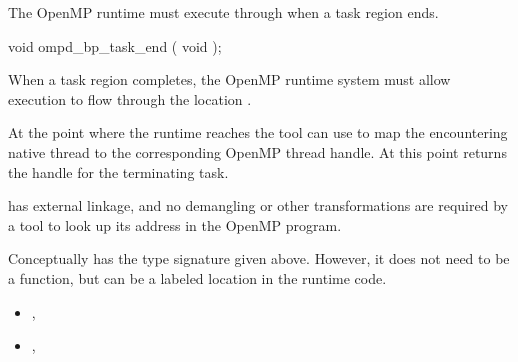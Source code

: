 \summary
The OpenMP runtime must execute through 
when a task region ends.


\begin{cspecific}
\begin{ompSyntax}
void ompd_bp_task_end ( void );
\end{ompSyntax}
\end{cspecific}


\descr

When a task region completes, the OpenMP runtime system
must allow execution to flow through the location .

At the point where the runtime reaches 
the tool can use
to map the encountering native thread to the corresponding
OpenMP thread handle.
At this point 
returns the handle for the terminating task.

\restrictions

 has external  linkage, and no
demangling or other transformations are required by a tool
to look up its address in the OpenMP program.

Conceptually  has the type signature
given above.
However, it does not need to be a function, but can be a labeled location
in the runtime code.

\crossreferences
\begin{itemize}
\item
  , 
\item
  , 
\end{itemize}

